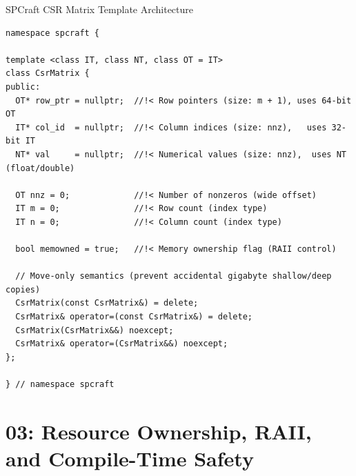 \documentclass[aspectratio=169,10pt]{beamer}
\newcommand{\sectionfoot}[1]{\gdef\insertsectionhead{#1}}
\begin{document}
\begin{frame}[fragile]{SPCraft CSR Matrix Template Architecture}
  \begin{lstlisting}[style=lecturecode]
namespace spcraft {

template <class IT, class NT, class OT = IT>
class CsrMatrix {
public:
  OT* row_ptr = nullptr;  //!< Row pointers (size: m + 1), uses 64-bit OT
  IT* col_id  = nullptr;  //!< Column indices (size: nnz),   uses 32-bit IT
  NT* val     = nullptr;  //!< Numerical values (size: nnz),  uses NT (float/double)

  OT nnz = 0;             //!< Number of nonzeros (wide offset)
  IT m = 0;               //!< Row count (index type)
  IT n = 0;               //!< Column count (index type)

  bool memowned = true;   //!< Memory ownership flag (RAII control)

  // Move-only semantics (prevent accidental gigabyte shallow/deep copies)
  CsrMatrix(const CsrMatrix&) = delete;
  CsrMatrix& operator=(const CsrMatrix&) = delete;
  CsrMatrix(CsrMatrix&&) noexcept;
  CsrMatrix& operator=(CsrMatrix&&) noexcept;
};

} // namespace spcraft
  \end{lstlisting}
\end{frame}

\section{03: Resource Ownership, RAII, and Compile-Time Safety}
\sectionfoot{03: Ownership \& Move Semantics}
\end{document}
